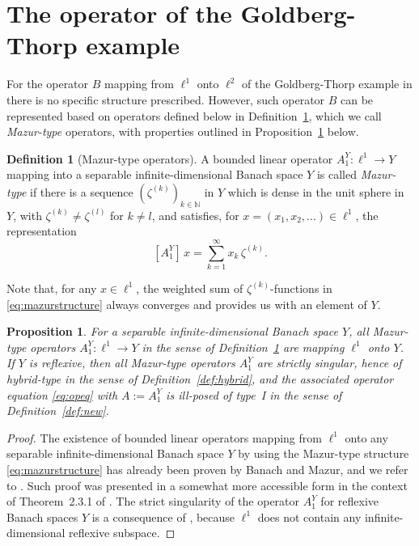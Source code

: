 \documentclass[12pt,twoside,reqno]{amsart}
\newtheorem{proposition}[theorem]{Proposition}
\theoremstyle{definition}
\newtheorem{definition}[theorem]{Definition}
\numberwithin{equation}{section}
\begin{document}
\section{The operator of the Goldberg-Thorp example} \label{sec:Goldberg}

For the operator $B$ mapping from $\ell^1$ onto $\ell^2$ of the Goldberg-Thorp example in \cite{GoldThorp63} there is no specific structure prescribed. However, such operator $B$ can
be represented based on operators defined below in Definition~\ref{def:mazur}, which we call \emph{Mazur-type} operators, with properties outlined in Proposition~\ref{pro:mazur} below.


\begin{definition}[Mazur-type operators]\label{def:mazur}
A bounded linear operator $A_1^Y: \ell^1 \to Y$ mapping into a separable infinite-dimensional Banach space $Y$ is called \emph{Mazur-type} if there is a sequence $(\zeta^{(k)})_{k\in\mathbb{N}}$ in $Y$ which is dense in the unit sphere in $Y$, with $\zeta^{(k)}\neq\zeta^{(l)}$ for $k\neq l$, and satisfies, for $x=(x_1,x_2,...) \in \ell^1$, the representation
\begin{equation}\label{eq:mazurstructure}
[A_1 ^Y]\,x=\sum_{k=1}^\infty x_k\,\zeta^{(k)}.
\end{equation}
\end{definition}


\smallskip

Note that, for any $x \in \ell^1$, the weighted sum of $\zeta^{(k)}$-functions in \eqref{eq:mazurstructure} always converges and provides us with an element of $Y$.




\begin{proposition} \label{pro:mazur}
For a separable infinite-dimensional Banach space $Y$, all Mazur-type operators $A_1^Y: \ell^1 \to Y$ in the sense of Definition~\ref{def:mazur} are mapping $\ell^1$ \emph{onto} $Y$.
If $Y$ is reflexive, then all Mazur-type operators $A_1^Y$ are strictly singular, hence of hybrid-type in the sense of Definition~\ref{def:hybrid}, and the associated operator equation \eqref{eq:opeq} with $A:=A_1^Y$ is ill-posed of type~I in the sense of
Definition~\ref{def:new}.
\end{proposition}
\begin{proof}
The existence of bounded linear operators mapping from $\ell^1$ onto any separable infinite-dimensional Banach space $Y$ by using the Mazur-type structure \eqref{eq:mazurstructure} has already been proven by Banach and Mazur, and we refer to  \cite[page~111, item (e)]{Mazur33}. Such proof was presented in a somewhat more accessible form in the context of Theorem~2.3.1 of \cite{AlbKal06}.
The strict singularity of the operator $A_1^Y$ for reflexive Banach spaces $Y$ is a consequence of \cite[Theorem,~item~(b),~p.~334]{GoldThorp63}, because $\ell^1$ does not contain any infinite-dimensional reflexive subspace.
\end{proof}
\end{document}
